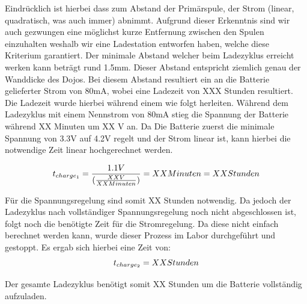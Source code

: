 Eindrücklich ist hierbei dass zum Abstand der Primärspule, der Strom (linear, quadratisch, was auch immer) abnimmt. Aufgrund dieser Erkenntnis sind wir auch gezwungen eine möglichst kurze Entfernung zwischen den Spulen einzuhalten weshalb wir eine Ladestation entworfen haben, welche diese Kriterium garantiert. Der minimale Abstand welcher beim Ladezyklus erreicht werken kann beträgt rund 1.5mm. Dieser Abstand entspricht ziemlich genau der Wanddicke des Dojos. Bei diesem Abstand resultiert ein an die Batterie gelieferter Strom von 80mA, wobei eine Ladezeit von XXX Stunden resultiert. Die Ladezeit wurde hierbei während einem wie folgt herleiten. Während dem Ladezyklus mit einem Nennstrom von 80mA stieg die Spannung der Batterie während XX Minuten um XX V an. Da Die Batterie zuerst die minimale Spannung von 3.3V auf 4.2V regelt und der Strom linear ist, kann hierbei die notwendige Zeit linear hochgerechnet werden. 

\begin{equation}
\centering
t_{charge_{1}}=\frac{1.1 V}{(\frac{XX V}{XX Minuten})}=XX Minuten= XX Stunden
\label{eq:LadezeitSpannungsregelung}
\end{equation}

Für die Spannungsregelung sind somit XX Stunden notwendig. Da jedoch der Ladezyklus nach vollständiger Spannungsregelung noch nicht abgeschlossen ist, folgt noch die benötigte Zeit für die Stromregelung. Da diese nicht einfach berechnet werden kann, wurde dieser Prozess im Labor durchgeführt und gestoppt. Es ergab sich hierbei eine Zeit von:
\begin{equation}
\centering
t_{charge_{2}}= XX Stunden
\label{eq:LadezeitStromregelung}
\end{equation}

Der gesamte Ladezyklus benötigt somit XX Stunden um die Batterie vollständig aufzuladen.  
